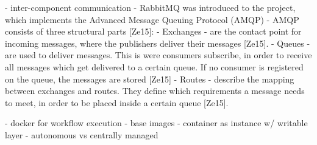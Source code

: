 
- inter-component communication
  - RabbitMQ was introduced to the project, which implements the Advanced Message Queuing Protocol (AMQP)
  - AMQP consists of three structural parts [Ze15]:
    - Exchanges
      -  are the contact point for incoming messages, where the publishers deliver their messages [Ze15].
    - Queues
      - are used to deliver messages. This is were consumers subscribe, in order to receive all messages which get delivered to a certain queue. If no consumer is registered on the queue, the messages are stored [Ze15]
    - Routes
      -  describe the mapping between exchanges and routes. They define which requirements a message needs to meet, in order to be placed inside a certain queue [Ze15].

- docker for workflow execution
  - base images
  - container as instance w/ writable layer
  - autonomous vs centrally managed



